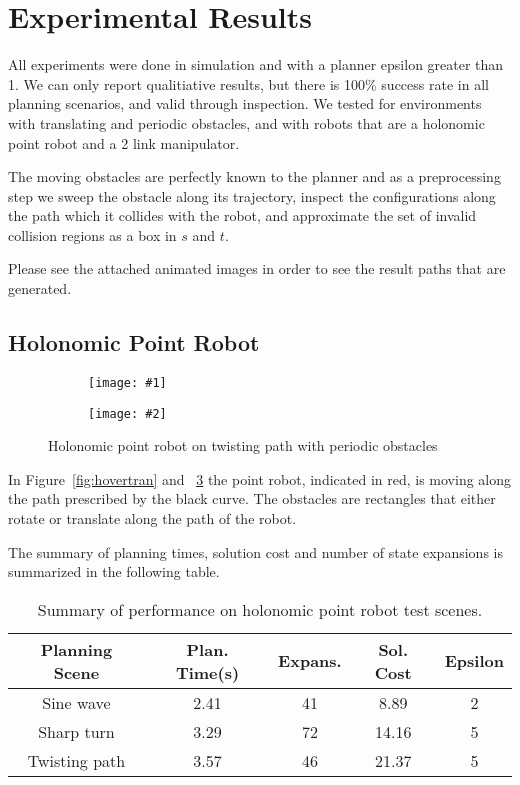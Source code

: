 \documentclass[letterpaper,12pt]{article} %
\newcommand{\ffigdouble}[4]{
    \begin{figure}[h!]
    \centering

    \begin{subfigure}[t!]{0.48\linewidth}
    \texttt{[image: \#1]}
    \caption{}
    \label{fig:#4L}
    \end{subfigure}
    \begin{subfigure}[b!]{0.48\linewidth}
    \texttt{[image: \#2]}
    \caption{}
    \label{fig:#4R}
    \end{subfigure}

    \caption{#3}
    \label{fig:#4}
    \end{figure}
}
\begin{document}
\section{Experimental Results}

All experiments were done in simulation and with a planner epsilon greater than 1. We can only report qualitiative results, but there is 100\% success rate in all planning scenarios, and valid through inspection. We tested for environments with translating and periodic obstacles, and with robots that are a holonomic point robot and a 2 link manipulator.

The moving obstacles are perfectly known to the planner and as a preprocessing step we sweep the obstacle along its trajectory, inspect the configurations along the path which it collides with the robot, and approximate the set of invalid collision regions as a box in $s$ and $t$.

Please see the attached animated images in order to see the result paths that are generated.

\subsection{Holonomic Point Robot}

\ffigdouble{pics/twist1}{pics/twist2}{Holonomic point robot on twisting path with periodic obstacles}{hovertwist}

In Figure~\ref{fig:hovertran} and ~\ref{fig:hovertwist} the point robot, indicated in red, is moving along the path prescribed by the black curve. The obstacles are rectangles that either rotate or translate along the path of the robot.

The summary of planning times, solution cost and number of state expansions is summarized in the following table.


\begin{table}[hc]
\begin{center}
\begin{tabular}{c|c|c|c|c}
\hline
Planning Scene & Plan. Time(s) & Expans. & Sol. Cost & Epsilon\\
\hline
Sine wave & 2.41 & 41 & 8.89 & 2\\
Sharp turn & 3.29 & 72 & 14.16 & 5 \\
Twisting path & 3.57 & 46 & 21.37 & 5\\
\hline
\end{tabular}
\caption{\small{Summary of performance on holonomic point robot test scenes.}}
\label{tab:performance_results}
\end{center}
\end{table}
\end{document}
